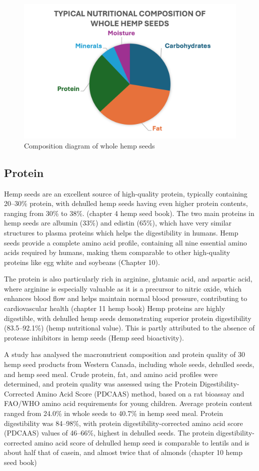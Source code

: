 \begin{figure}[H]
    \centering
    \includegraphics[width=0.75\linewidth]{Figures/fig_prod_concept_02.png}
    \caption{Composition diagram of whole hemp seeds}
    \label{fig:prod_concept_02}
\end{figure}

\subsection{Protein}
Hemp seeds are an excellent source of high-quality protein, typically containing 20–30\% protein, with dehulled hemp seeds having even higher protein contents, ranging from 30\% to 38\%. (chapter 4 hemp seed book). The two main proteins in hemp seeds are albumin (33\%) and edistin (65\%), which have very similar structures to plasma proteins which helps the digestibility in humans. Hemp seeds provide a complete amino acid profile, containing all nine essential amino acids required by humans, making them comparable to other high-quality proteins like egg white and soybeans (Chapter 10). 

\vspace{1em}
The protein is also particularly rich in arginine, glutamic acid, and aspartic acid, where arginine is especially valuable as it is a precursor to nitric oxide, which enhances blood flow and helps maintain normal blood pressure, contributing to cardiovascular health (chapter 11 hemp book)
Hemp proteins are highly digestible, with dehulled hemp seeds demonstrating superior protein digestibility (83.5–92.1\%) (hemp nutritional value). This is partly attributed to the absence of protease inhibitors in hemp seeds (Hemp seed bioactivity). 

\vspace{1em}
A study has analysed the macronutrient composition and protein quality of 30 hemp seed products from Western Canada, including whole seeds, dehulled seeds, and hemp seed meal. Crude protein, fat, and amino acid profiles were determined, and protein quality was assessed using the Protein Digestibility-Corrected Amino Acid Score (PDCAAS) method, based on a rat bioassay and FAO/WHO amino acid requirements for young children. Average protein content ranged from 24.0\% in whole seeds to 40.7\% in hemp seed meal. Protein digestibility was 84–98\%, with protein digestibility-corrected amino acid score (PDCAAS) values of 46–66\%, highest in dehulled seeds. The protein digestibility-corrected amino acid score of dehulled hemp seed is comparable to lentils and is about half that of casein, and almost twice that of almonds (chapter 10 hemp seed book)

